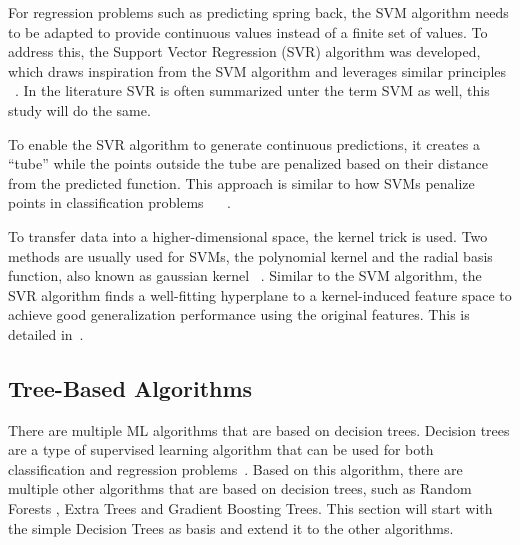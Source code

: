 For regression problems such as predicting spring back, the \ac{SVM} algorithm
needs to be adapted to provide continuous values instead of a finite set of values.
To address this, the Support Vector Regression (SVR) algorithm was developed, which draws inspiration from the
\ac{SVM} algorithm and leverages similar principles
~\cite[p. 92]{muller2016introduction}.
In the literature SVR is often summarized unter the term SVM as well, this study will do the same.

To enable the \ac{SVR} algorithm to generate continuous predictions, it creates a ``tube''
while the points outside the tube are penalized based on their distance from the
predicted function.
This approach is similar to how \ac{SVM}s penalize points in classification
problems
~\cite[p. 369]{montesinos2022support}
~\cite[pp. 67--68]{awad2015efficient}.

To transfer data into a higher-dimensional space, the kernel trick is used.
Two methods are usually used for \ac{SVM}s, the polynomial kernel and the radial basis
function, also known as gaussian kernel
~\cite[pp. 97--98]{muller2016introduction}.
Similar to the \ac{SVM} algorithm, the \ac{SVR} algorithm finds a well-fitting hyperplane to a
kernel-induced feature space to achieve good generalization performance using the original
features.
This is detailed in~\cite[p. 369]{montesinos2022support}.

\subsection{Tree-Based Algorithms}\label{subsec:tree-based-algorithms}

There are multiple \ac{ML} algorithms that are based on decision trees.
Decision trees are a type of supervised learning algorithm that can be used for both classification and regression
problems~\cite[p. 70]{muller2016introduction}.
Based on this algorithm, there are multiple other algorithms that are based on decision trees, such as Random Forests
, Extra Trees and Gradient Boosting Trees.
This section will start with the simple Decision Trees as basis and extend it to the other algorithms.


